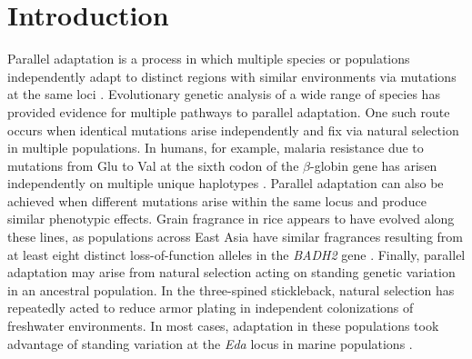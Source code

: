 \section*{Introduction}
\noindent Parallel adaptation is a process in which multiple species or populations independently adapt to distinct regions with similar environments via mutations at the same loci \cite[]{Wood_2005_15881688,Arendt_2008_18022278,Elmer_2011_21459472}.
Evolutionary genetic analysis of a wide range of species has provided evidence for multiple pathways to parallel adaptation. One such route occurs when identical mutations arise independently and fix via natural selection in multiple populations. In humans, for example, malaria resistance due to mutations from Glu to Val at the sixth codon of the $\beta$-globin gene has arisen independently on multiple unique haplotypes  \cite[]{Currat_2002_11741197,Kwiatkowski_2005_16001361}.  Parallel adaptation can also be achieved when different mutations arise within the same locus and produce similar phenotypic effects.  Grain fragrance in rice appears to have evolved along these lines, as populations across East Asia have similar fragrances resulting from at least eight distinct loss-of-function alleles in the  \emph{BADH2} gene \cite[]{Kovach_2009_19706531}.  Finally, parallel adaptation may arise from natural selection acting on standing genetic variation in an ancestral population.  In the three-spined stickleback, natural selection has repeatedly acted to reduce armor plating in independent colonizations of freshwater environments.  In most cases, adaptation in these populations took advantage of standing variation at the \emph{Eda} locus in marine populations \cite[]{Colosimo_2005_15790847}.  
%
%

%

%
%

